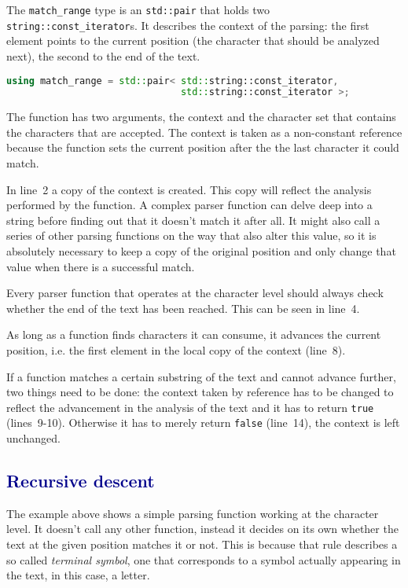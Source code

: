 \documentclass[12pt]{article}
\newcommand{\usubsec}[2]{\subsection*{\textcolor{darkblue}{#1}}\label{subsec:#2}\addcontentsline{toc}{subsection}{#1}}
\begin{document}
The \texttt{match\_range} type is an \texttt{std::pair} that holds two \texttt{string::const\_iterator}s. It
describes the context of the parsing: the first element points to the current position (the character that
should be analyzed next), the second to the end of the text.

\begin{center}
	\begin{minipage}[h]{0.8\textwidth}\label{lst:matchrange}
		\begin{lstlisting}[language=C++, breaklines=true]
using match_range = std::pair< std::string::const_iterator,
                               std::string::const_iterator >;
		\end{lstlisting}
	\end{minipage}
\end{center}

The function has two arguments, the context and the character set that contains the characters that are
accepted. The context is taken as a non-constant reference because the function sets the current position
after the the last character it could match.

In line~2 a copy of the context is created. This copy will reflect the analysis performed by the function. A
complex parser function can delve deep into a string before finding out that it doesn't match it after all. It
might also call a series of other parsing functions on the way that also alter this value, so it is absolutely
necessary to keep a copy of the original position and only change that value when there is a successful match.

Every parser function that operates at the character level should always check whether the end of the text has
been reached. This can be seen in line~4.

As long as a function finds characters it can consume, it advances the current position, i.e. the first
element in the local copy of the context (line~8).

If a function matches a certain substring of the text and cannot advance further, two things need to be done:
the context taken by reference has to be changed to reflect the advancement in the analysis of the text and it
has to return \texttt{true} (lines~9-10). Otherwise it has to merely return \texttt{false} (line~14), the
context is left unchanged.

\usubsec{Recursive descent}{recdesc}
The example above shows a simple parsing function working at the character level. It doesn't call any other
function, instead it decides on its own whether the text at the given position matches it or not. This is
because that rule describes a so called \emph{terminal symbol}, one that corresponds to a symbol actually
appearing in the text, in this case, a letter.
\end{document}
